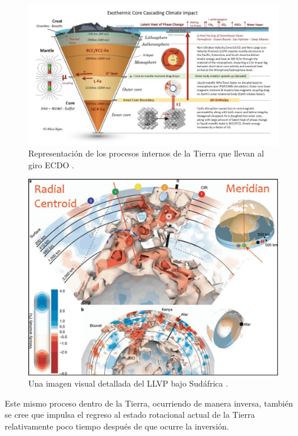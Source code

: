 \documentclass[10pt,twocolumn,letterpaper]{article}
\begin{document}
\begin{figure}[t]
\begin{center}
\includegraphics[width=1\textwidth]{layers.jpg}
\end{center}
   \caption{Representación de los procesos internos de la Tierra que llevan al giro ECDO \cite{129}.}
\label{fig:11}
\end{figure}
\begin{figure}[t]
\begin{center}
   \includegraphics[width=1\linewidth]{llvp.jpg}
\end{center}
   \caption{Una imagen visual detallada del LLVP bajo Sudáfrica \cite{28}.}
\label{fig:12}
\label{fig:onecol}
\end{figure}


Este mismo proceso dentro de la Tierra, ocurriendo de manera inversa, también se cree que impulsa el regreso al estado rotacional actual de la Tierra relativamente poco tiempo después de que ocurre la inversión.
\end{document}
